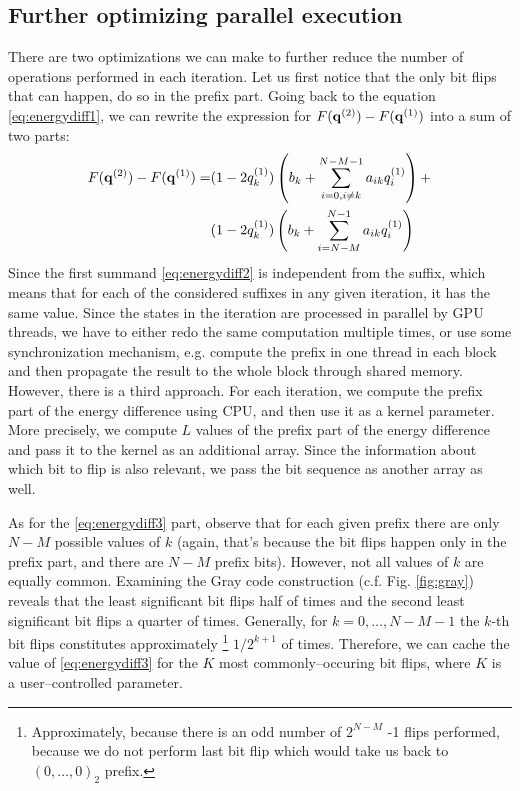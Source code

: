 \subsection{Further optimizing parallel execution}

There are two optimizations we can make to further reduce the number of
operations performed in each iteration. Let us first notice that the only bit
flips that can happen, do so in the prefix part. Going back to the equation
\eqref{eq:energydiff1}, we can rewrite the expression for $F(\mathbf{q}^{(2)})-F(\mathbf{q}^{(1)})$
into a sum of two parts:
\begin{align}
  F(\mathbf{q}^{(2)})-F(\mathbf{q}^{(1)}) = & (1-2q^{(1)}_{k}) \left(b_{k} + \sum_{i=0,i\ne k}^{N-M-1}a_{ik}q^{(1)}_{i}\right) + \label{eq:energydiff2} \\
                        & (1-2q^{(1)}_{k}) \left(b_{k} + \sum_{i=N-M}^{N-1}a_{ik}q^{(1)}_{i}\right)\label{eq:energydiff3}
\end{align}
Since the first summand \eqref{eq:energydiff2} is independent from the suffix,
which means that for each of the considered suffixes in any given iteration, it
has the same value. Since the states in the iteration are processed in parallel
by GPU threads, we have to either redo the same computation multiple times, or
use some synchronization mechanism, e.g. compute the prefix in one thread in
each block and then propagate the result to the whole block through shared
memory. However, there is a third approach. For each iteration, we compute the
prefix part of the energy difference using CPU, and then use it as a kernel
parameter. More precisely, we compute $L$ values of the prefix part of the
energy difference and pass it to the kernel as an additional array. Since the
information about which bit to flip is also relevant, we pass the bit sequence
as another array as well.

As for the \eqref{eq:energydiff3} part, observe that for each given prefix
there are only $N-M$ possible values of $k$ (again, that's because the bit
flips happen only in the prefix part, and there are $N-M$ prefix bits).
However, not all values of $k$ are equally common. Examining the Gray code
construction (c.f. Fig. \ref{fig:gray}) reveals that the least significant bit
flips half of times and the second least significant bit flips a quarter of
times. Generally, for $k=0,\ldots,N-M-1$ the $k$-th bit flips constitutes
approximately \footnote{Approximately, because there is an odd number of
$2^{N-M}$ -1 flips performed, because we do not perform last bit flip which
    would take us back to $(0,\ldots,0)_2$ prefix.} $1/2^{k+1}$ of times.
Therefore, we can cache the value of \eqref{eq:energydiff3} for the $K$ most
commonly--occuring bit flips, where $K$ is a user--controlled parameter.

